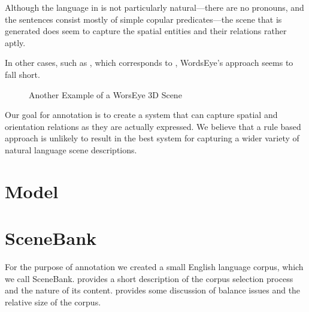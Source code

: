 \documentclass[11pt]{article}
\begin{document}
Although the language in  is not particularly natural---there are no pronouns, and the sentences consist mostly of simple copular predicates---the scene that is generated does seem to capture the spatial entities and their relations rather aptly.

In other cases, such as , which corresponds to , WordsEye's approach seems to fall short.

\begin{figure}
    \begin{center}
    \end{center}
    \caption{Another Example of a WorsEye 3D Scene}
    \label{fig:wordseye-2}
\end{figure}

\label{ex:wordseye-2}

Our goal for annotation is to create a system that can capture spatial and orientation relations as they are actually expressed. We believe that a rule based approach is unlikely to result in the best system for capturing a wider variety of natural language scene descriptions.


\section{Model} %
\label{sec:model}


\section{SceneBank} %
\label{scenebank_data}

For the purpose of annotation we created a small English language corpus, which we call SceneBank.  provides a short description of the corpus selection process and the nature of its content.  provides some discussion of balance issues and the relative size of the corpus.
\end{document}
